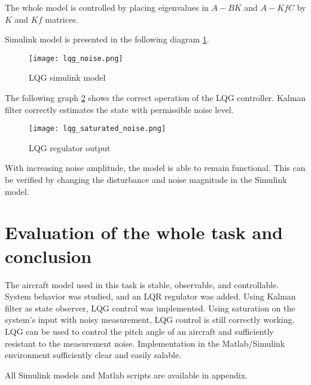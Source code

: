 The whole model is controlled by placing eigenvalues in $A-BK$ and $A-KfC$
by $K$ and $Kf$ matrices. 
 

Simulink model is presented in the following diagram
\ref{fig:lqg_noise}.

\begin{figure}[hbt!]
    \centering
    \texttt{[image: lqg\_noise.png]}
    \caption{LQG simulink model}
    \label{fig:lqg_noise}
\end{figure}


The following graph \ref{fig:lqg_noise_plot} shows the correct operation
of the LQG controller. Kalman filter correctly estimates the state with
permissible noise level.

\begin{figure}[hbt!]
    \centering
    \texttt{[image: lqg\_saturated\_noise.png]}
    \caption{LQG regulator output}
    \label{fig:lqg_noise_plot}
\end{figure}

With increasing noise amplitude, the model is able to remain functional.
This can be verified by changing the disturbance and noise magnitude in the
Simulink model.

\section{Evaluation of the whole task and conclusion}
The aircraft model used in this task is stable, observable, and
controllable.  System behavior was studied, and an LQR regulator was added.
Using Kalman filter as state observer, LQG control was implemented. Using
saturation on the system's input with noisy measurement, LQG control is
still correctly working.  LQG can be used to control the pitch angle of an
aircraft and sufficiently resistant to the measurement noise.
Implementation in the Matlab/Simulink environment sufficiently clear and
easily salable.

All Simulink models and Matlab scripts are available in appendix.
